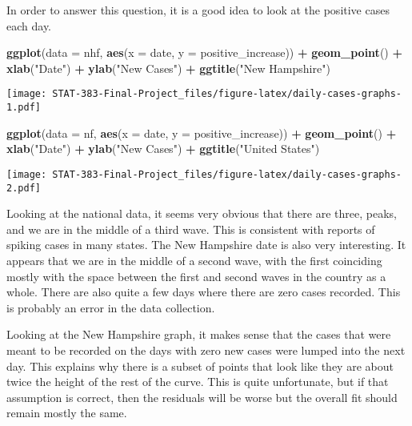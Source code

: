 \documentclass[
]{article}
\newenvironment{Shaded}{\begin{snugshade}}{\end{snugshade}}
\newcommand{\DataTypeTok}[1]{\textcolor[rgb]{0.13,0.29,0.53}{#1}}
\newcommand{\KeywordTok}[1]{\textcolor[rgb]{0.13,0.29,0.53}{\textbf{#1}}}
\newcommand{\NormalTok}[1]{#1}
\newcommand{\OperatorTok}[1]{\textcolor[rgb]{0.81,0.36,0.00}{\textbf{#1}}}
\newcommand{\StringTok}[1]{\textcolor[rgb]{0.31,0.60,0.02}{#1}}
\begin{document}
In order to answer this question, it is a good idea to look at the
positive cases each day.

\begin{Shaded}
\begin{Highlighting}[]
\KeywordTok{ggplot}\NormalTok{(}\DataTypeTok{data =}\NormalTok{ nhf, }\KeywordTok{aes}\NormalTok{(}\DataTypeTok{x =}\NormalTok{ date, }\DataTypeTok{y =}\NormalTok{ positive_increase)) }\OperatorTok{+}\StringTok{ }\KeywordTok{geom_point}\NormalTok{() }\OperatorTok{+}\StringTok{ }\KeywordTok{xlab}\NormalTok{(}\StringTok{"Date"}\NormalTok{) }\OperatorTok{+}\StringTok{ }\KeywordTok{ylab}\NormalTok{(}\StringTok{"New Cases"}\NormalTok{) }\OperatorTok{+}\StringTok{ }\KeywordTok{ggtitle}\NormalTok{(}\StringTok{"New Hampshire"}\NormalTok{)}
\end{Highlighting}
\end{Shaded}

\texttt{[image: STAT-383-Final-Project\_files/figure-latex/daily-cases-graphs-1.pdf]}

\begin{Shaded}
\begin{Highlighting}[]
\KeywordTok{ggplot}\NormalTok{(}\DataTypeTok{data =}\NormalTok{ nf, }\KeywordTok{aes}\NormalTok{(}\DataTypeTok{x =}\NormalTok{ date, }\DataTypeTok{y =}\NormalTok{ positive_increase)) }\OperatorTok{+}\StringTok{ }\KeywordTok{geom_point}\NormalTok{() }\OperatorTok{+}\StringTok{ }\KeywordTok{xlab}\NormalTok{(}\StringTok{"Date"}\NormalTok{) }\OperatorTok{+}\StringTok{ }\KeywordTok{ylab}\NormalTok{(}\StringTok{"New Cases"}\NormalTok{) }\OperatorTok{+}\StringTok{ }\KeywordTok{ggtitle}\NormalTok{(}\StringTok{"United States"}\NormalTok{)}
\end{Highlighting}
\end{Shaded}

\texttt{[image: STAT-383-Final-Project\_files/figure-latex/daily-cases-graphs-2.pdf]}

Looking at the national data, it seems very obvious that there are
three, peaks, and we are in the middle of a third wave. This is
consistent with reports of spiking cases in many states. The New
Hampshire date is also very interesting. It appears that we are in the
middle of a second wave, with the first coinciding mostly with the space
between the first and second waves in the country as a whole. There are
also quite a few days where there are zero cases recorded. This is
probably an error in the data collection.

Looking at the New Hampshire graph, it makes sense that the cases that
were meant to be recorded on the days with zero new cases were lumped
into the next day. This explains why there is a subset of points that
look like they are about twice the height of the rest of the curve. This
is quite unfortunate, but if that assumption is correct, then the
residuals will be worse but the overall fit should remain mostly the
same.
\end{document}
